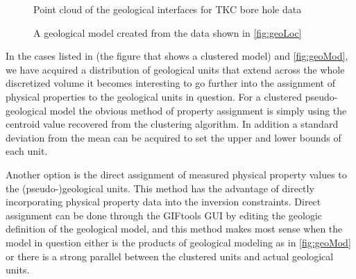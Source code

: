 \begin{figure} [h]
    \centering
    \caption{Point cloud of the geological interfaces for TKC bore hole data}
    \label{fig:geoLoc}
\end{figure}

\begin{figure} [h]
    \centering
    \caption{A geological model created from the data shown in \autoref{fig:geoLoc}}
    \label{fig:geoMod}
\end{figure}

In the cases listed in (the figure that shows a clustered model) and \autoref{fig:geoMod}, we have acquired a distribution of geological units that extend across the whole discretized volume it becomes interesting to go further into the assignment of physical properties to the geological units in question. For a clustered pseudo-geological model the obvious method of property assignment is simply using the centroid value recovered from the clustering algorithm. In addition a standard deviation from the mean can be acquired to set the upper and lower bounds of each unit.

Another option is the direct assignment of measured physical property values to the (pseudo-)geological units. This method has the advantage of directly incorporating physical property data into the inversion constraints. Direct assignment can be done through the GIFtools \ac{GUI} by editing the geologic definition of the geological model, and this method makes most sense when the model in question either is the products of geological modeling as in \autoref{fig:geoMod} or there is a strong parallel between the clustered units and actual geological units. 

